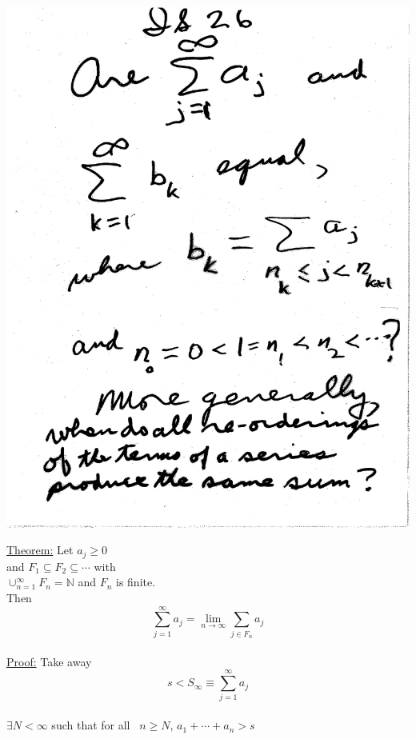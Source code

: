 \documentclass[10pt,a4paper]{article}
\begin{document}
\includegraphics[scale=.5]{Pages/IS_26}

\newpage

\noindent \underline{Theorem:} Let $a_j \geq 0$
\\ and $F_1 \subseteq F_2 \subseteq \cdots $ with
\\ $ \cup_{n=1}^{\infty} F_n = \mathbb{N} $ and $F_n$ is finite.
\\ Then $$\sum_{j=1}^{\infty} a_j = \lim_{n \rightarrow \infty} \sum_{j \in F_n} a_j$$
\vspace{5mm}
\\ \underline{Proof:} Take away
\\ $$ s < S_{\infty} \equiv \sum_{j=1}^{\infty} a_j$$
\\ $ \exists N < \infty$ such that for all 
\ $ n \geq N$, $a_1 + \cdots + a_n > s$
\end{document}
